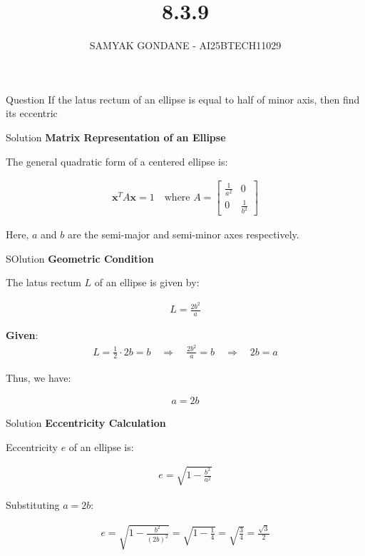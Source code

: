 \documentclass{beamer}
\title 
{8.3.9}
\date{}
\author
{SAMYAK GONDANE - AI25BTECH11029}
\begin{document}
\frame{\titlepage}

\begin{frame}{Question}
If the latus rectum of an ellipse is equal to half of minor axis, then find its eccentric
\end{frame}

\begin{frame}{Solution}
\textbf{Matrix Representation of an Ellipse}

The general quadratic form of a centered ellipse is:


\begin{align}
\mathbf{x}^T A \mathbf{x} = 1
\quad \text{where } A = 
\begin{bmatrix}
\frac{1}{a^2} & 0 \\
0 & \frac{1}{b^2}
\end{bmatrix}
\end{align}

Here, $a$ and $b$ are the semi-major and semi-minor axes respectively.
\end{frame}


\begin{frame}{SOlution}
\textbf{Geometric Condition}

The latus rectum $L$ of an ellipse is given by:


\begin{align}
L = \frac{2b^2}{a}
\end{align}



\textbf{Given}:
\begin{align}
L = \frac{1}{2} \cdot 2b = b
\quad \Rightarrow \quad \frac{2b^2}{a} = b
\quad \Rightarrow \quad 2b = a
\end{align}

Thus, we have:

\begin{align}
a = 2b
\end{align}
\end{frame}


\begin{frame}{Solution}
\textbf{Eccentricity Calculation}

Eccentricity $e$ of an ellipse is:


\begin{align}
e = \sqrt{1 - \frac{b^2}{a^2}}
\end{align}

Substituting $a = 2b$:

\begin{align}
e = \sqrt{1 - \frac{b^2}{(2b)^2}} = \sqrt{1 - \frac{1}{4}} = \sqrt{\frac{3}{4}} = \frac{\sqrt{3}}{2}
\end{align}
\end{frame}
\end{document}
